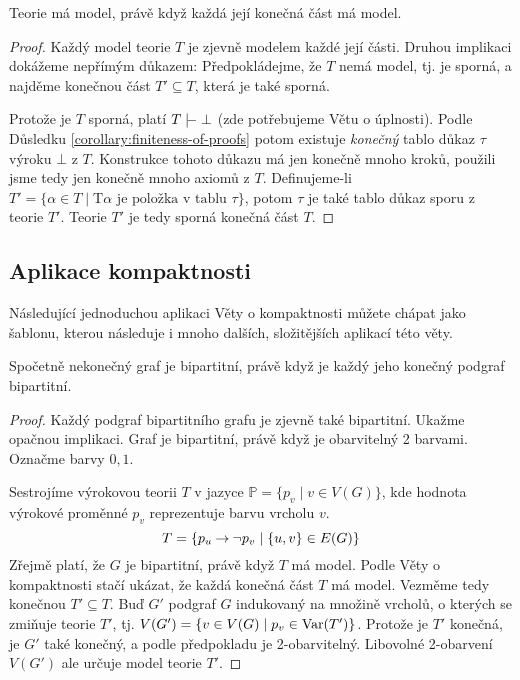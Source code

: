 \begin{theorem}[O kompaktnosti]\label{theorem:compactness-theorem}
Teorie má model, právě když každá její konečná část má model.    
\end{theorem}

\begin{proof}
Každý model teorie $T$ je zjevně modelem každé její části. Druhou implikaci dokážeme nepřímým důkazem: Předpokládejme, že $T$ nemá model, tj. je sporná, a najděme konečnou část $T'\subseteq T$, která je také sporná.

Protože je $T$ sporná, platí $T\proves\bot$ (zde potřebujeme Větu o úplnosti). Podle Důsledku \ref{corollary:finiteness-of-proofs} potom existuje \emph{konečný} tablo důkaz $\tau$ výroku $\bot$ z $T$. Konstrukce tohoto důkazu má jen konečně mnoho kroků, použili jsme tedy jen konečně mnoho axiomů z $T$. Definujeme-li $T'=\{\alpha\in T\mid \mathrm{T}\alpha\text{ je položka v tablu $\tau$}\}$, potom $\tau$ je také tablo důkaz sporu z teorie $T'$. Teorie $T'$ je tedy sporná konečná část $T$.
\end{proof}

\subsection{Aplikace kompaktnosti}

Následující jednoduchou aplikaci Věty o kompaktnosti můžete chápat jako šablonu, kterou následuje i mnoho dalších, složitějších aplikací této věty. 

\begin{corollary}\label{corollary:infinite-bipartite-compactness}
Spočetně nekonečný graf je bipartitní, právě když je každý jeho konečný podgraf bipartitní.    
\end{corollary}

\begin{proof}
    Každý podgraf bipartitního grafu je zjevně také bipartitní. Ukažme opačnou implikaci. Graf je bipartitní, právě když je obarvitelný 2 barvami. Označme barvy $0,1$.

    Sestrojíme výrokovou teorii $T$ v jazyce $\mathbb P=\{p_v\mid v\in V(G)\}$, kde hodnota výrokové proměnné $p_v$ reprezentuje barvu vrcholu $v$.
    $$  
        T=\{p_u\mathbin{\rightarrow}\neg p_v\mid \{u,v\}\in E(G)\}
    $$
    Zřejmě platí, že $G$ je bipartitní, právě když $T$ má model. Podle Věty o kompaktnosti stačí ukázat, že každá konečná část $T$ má model. Vezměme tedy konečnou $T'\subseteq T$. Buď $G'$ podgraf $G$ indukovaný na množině vrcholů, o kterých se zmiňuje teorie $T'$, tj. $V(G')=\{v\in V(G)\mid p_v\in\operatorname{Var}(T')\}$. Protože je $T'$ konečná, je $G'$ také konečný, a podle předpokladu je 2-obarvitelný. Libovolné 2-obarvení $V(G')$ ale určuje model teorie $T'$.
\end{proof}

